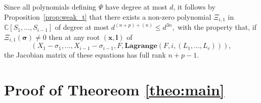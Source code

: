 \documentclass[12pt]{article}
\def\lb{{\bm l}}
\def\xb{{\bm x}}
\def\C{\mathbb{C}}
\def\lagF{{\bm{Lagrange}}(F,i,(L_1,\hdots,L_c))}
\begin{document}
Since all polynomials defining $\Psi$ have degree at most $d$, it
follows by Proposition~\ref{prop:weak_t} that there exists a non-zero
polynomial $\Xi_{i,1}$ in $\C[S_1,\dots,S_{i-1}]$ of degree at most
$d^{(n+p)+(n)}\leq d^{3n},$ with the property that, if $\Xi_{i,1}(\bm \sigma)\neq 0$ then at any root $(\xb,\lb)$ of
\[
\left(X_1-\sigma_1,\dots,X_{i-1}-\sigma_{i-1},F,\lagF\right),
\] 
  the Jacobian matrix of these
equations has full rank $n+p-1$. 



\section{Proof of Theoreom \ref{theo:main}}

\end{document}
